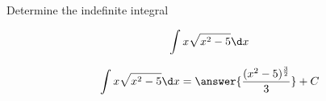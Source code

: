 \documentclass{ximera}
\author{Jason Miller}
\begin{document}
\begin{exercise}
Determine the indefinite integral 

\[
\int x\sqrt{x^{2}-5} \d x
\]


\[
\int x \sqrt{x^{2}-5} \d x= \answer{ \frac{ (x^{2}-5)^{\frac{3}{2}}}{3}    } + C
\]


\end{exercise}
\end{document}
